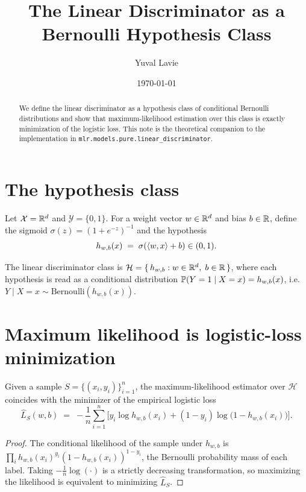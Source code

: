 \documentclass[11pt]{article}
\title{The Linear Discriminator as a Bernoulli Hypothesis Class}
\author{Yuval Lavie}
\date{\today}
\begin{document}
\maketitle

\begin{abstract}
We define the linear discriminator as a hypothesis class of conditional
Bernoulli distributions and show that maximum-likelihood estimation over this
class is exactly minimization of the logistic loss. This note is the
theoretical companion to the implementation in
\texttt{mlr.models.pure.linear\_discriminator}.
\end{abstract}

\section{The hypothesis class}

Let $\mathcal{X} = \mathbb{R}^d$ and $\mathcal{Y} = \{0, 1\}$. For a weight vector
$w \in \mathbb{R}^d$ and bias $b \in \mathbb{R}$, define the sigmoid
$\sigma(z) = (1 + e^{-z})^{-1}$ and the hypothesis
\begin{equation}
  h_{w,b}(x) \;=\; \sigma\!\left(\langle w, x \rangle + b\right) \in (0, 1).
\end{equation}

\begin{definition}
The linear discriminator class is
$\mathcal{H} = \{\, h_{w,b} : w \in \mathbb{R}^d,\; b \in \mathbb{R} \,\}$, where each
hypothesis is read as a conditional distribution
$\mathbb{P}(Y = 1 \mid X = x) = h_{w,b}(x)$, i.e.\
$Y \mid X = x \sim \mathrm{Bernoulli}\!\left(h_{w,b}(x)\right)$.
\end{definition}

\section{Maximum likelihood is logistic-loss minimization}

\begin{proposition}
Given a sample $S = \{(x_i, y_i)\}_{i=1}^n$, the maximum-likelihood
estimator over $\mathcal{H}$ coincides with the minimizer of the empirical
logistic loss
\begin{equation}
  \widehat{L}_S(w, b) \;=\; -\frac{1}{n} \sum_{i=1}^{n}
    \Big[ y_i \log h_{w,b}(x_i) + (1 - y_i) \log\!\big(1 - h_{w,b}(x_i)\big) \Big].
\end{equation}
\end{proposition}

\begin{proof}
The conditional likelihood of the sample under $h_{w,b}$ is
$\prod_i h_{w,b}(x_i)^{y_i} (1 - h_{w,b}(x_i))^{1 - y_i}$, the Bernoulli
probability mass of each label. Taking $-\frac{1}{n}\log(\cdot)$ is a strictly
decreasing transformation, so maximizing the likelihood is equivalent to
minimizing $\widehat{L}_S$.
\end{proof}
\end{document}
